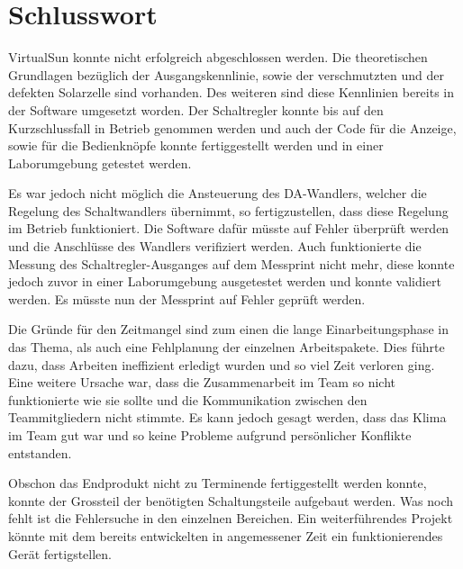 %
%
\section{Schlusswort}

VirtualSun konnte nicht erfolgreich abgeschlossen werden. Die theoretischen Grundlagen bezüglich der Ausgangskennlinie, sowie der verschmutzten und der defekten Solarzelle sind vorhanden. Des weiteren sind diese Kennlinien bereits in der Software umgesetzt worden. Der Schaltregler konnte bis auf den Kurzschlussfall in Betrieb genommen werden und auch der Code für die Anzeige, sowie für die Bedienknöpfe konnte fertiggestellt werden und in einer Laborumgebung getestet werden. 

Es war jedoch nicht möglich die Ansteuerung des DA-Wandlers, welcher die Regelung des Schaltwandlers übernimmt, so fertigzustellen, dass diese Regelung im Betrieb funktioniert. Die Software dafür müsste auf Fehler überprüft werden und die Anschlüsse des Wandlers verifiziert werden. Auch funktionierte die Messung des Schaltregler-Ausganges auf dem Messprint nicht mehr, diese konnte jedoch zuvor in einer Laborumgebung ausgetestet werden und konnte validiert werden. Es müsste nun der Messprint auf Fehler geprüft werden.



Die Gründe für den Zeitmangel sind zum einen die lange Einarbeitungsphase in das Thema, als auch eine Fehlplanung der einzelnen Arbeitspakete. Dies führte dazu, dass Arbeiten ineffizient erledigt wurden und so viel Zeit verloren ging. Eine weitere Ursache war, dass die Zusammenarbeit im Team so nicht funktionierte wie sie sollte und die Kommunikation zwischen den Teammitgliedern nicht stimmte. Es kann jedoch gesagt werden, dass das Klima im Team gut war und so keine Probleme aufgrund persönlicher Konflikte entstanden. 

Obschon das Endprodukt nicht zu Terminende fertiggestellt werden konnte, konnte der Grossteil der benötigten Schaltungsteile aufgebaut werden. Was noch fehlt ist die Fehlersuche in den einzelnen Bereichen. Ein weiterführendes Projekt könnte mit dem bereits entwickelten in angemessener Zeit ein funktionierendes Gerät fertigstellen.

%
